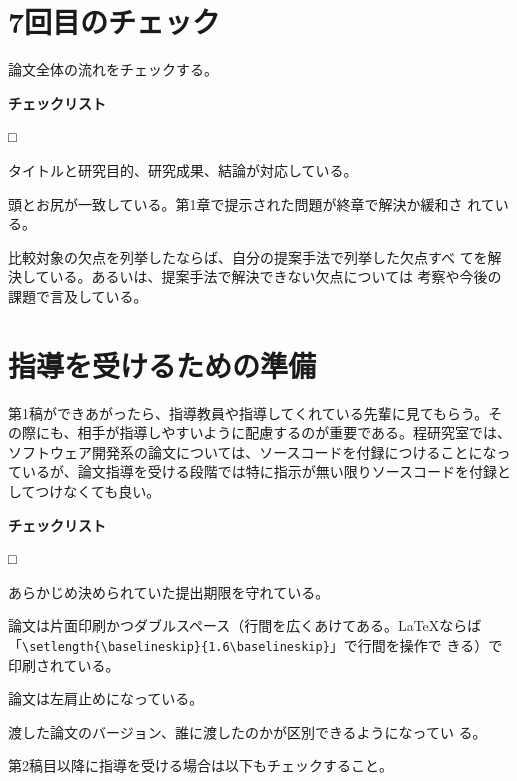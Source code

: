 \documentclass[11pt,a4j]{jsarticle}
\begin{document}
\section{7回目のチェック}

論文全体の流れをチェックする。

\begin{flushleft}
 {\bf チェックリスト}
\end{flushleft}
\begin{list}%
 {□} %
 {} %
 \item タイトルと研究目的、研究成果、結論が対応している。
 \item 頭とお尻が一致している。第1章で提示された問題が終章で解決か緩和さ
       れている。
 \item 比較対象の欠点を列挙したならば、自分の提案手法で列挙した欠点すべ
       てを解決している。あるいは、提案手法で解決できない欠点については
       考察や今後の課題で言及している。
 \end{list}

\section{指導を受けるための準備}

第1稿ができあがったら、指導教員や指導してくれている先輩に見てもらう。そ
の際にも、相手が指導しやすいように配慮するのが重要である。程研究室では、
ソフトウェア開発系の論文については、ソースコードを付録につけることになっ
ているが、論文指導を受ける段階では特に指示が無い限りソースコードを付録と
してつけなくても良い。

\begin{flushleft}
 {\bf チェックリスト}
\end{flushleft}
\begin{list}%
 {□} %
 {} %
 \item あらかじめ決められていた提出期限を守れている。 
 \item 論文は片面印刷かつダブルスペース（行間を広くあけてある。LaTeXならば\\
       「\verb+\setlength{\baselineskip}{1.6\baselineskip}+」で行間を操作で
       きる）で印刷されている。
 \item 論文は左肩止めになっている。
 \item 渡した論文のバージョン、誰に渡したのかが区別できるようになってい
       る。
 \end{list}

第2稿目以降に指導を受ける場合は以下もチェックすること。
\end{document}
